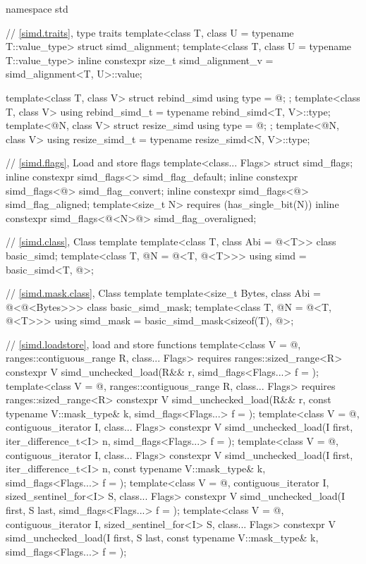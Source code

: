 \begin{codeblock}
namespace std {
  // \ref{simd.traits},  type traits
  template<class T, class U = typename T::value_type> struct simd_alignment;
  template<class T, class U = typename T::value_type>
    inline constexpr size_t simd_alignment_v = simd_alignment<T, U>::value;

  template<class T, class V> struct rebind_simd { using type = @\seebelow@; };
  template<class T, class V> using rebind_simd_t = typename rebind_simd<T, V>::type;
  template<@\simdsizetype@ N, class V> struct resize_simd { using type = @\seebelow@; };
  template<@\simdsizetype@ N, class V> using resize_simd_t = typename resize_simd<N, V>::type;

  // \ref{simd.flags}, Load and store flags
  template<class... Flags> struct simd_flags;
  inline constexpr simd_flags<> simd_flag_default{};
  inline constexpr simd_flags<@\convertflag@> simd_flag_convert{};
  inline constexpr simd_flags<@\alignedflag@> simd_flag_aligned{};
  template<size_t N> requires (has_single_bit(N))
    inline constexpr simd_flags<@\overalignedflag<N>@> simd_flag_overaligned{};

  // \ref{simd.class}, Class template 
  template<class T, class Abi = @\nativeabi@<T>> class basic_simd;
  template<class T, @\simdsizetype@ N = @\simdsizev@<T, @\nativeabi@<T>>>
    using simd = basic_simd<T, @>;

  // \ref{simd.mask.class}, Class template 
  template<size_t Bytes, class Abi = @\nativeabi@<@\integerfrom@<Bytes>>> class basic_simd_mask;
  template<class T, @\simdsizetype@ N = @\simdsizev@<T, @\nativeabi@<T>>>
    using simd_mask = basic_simd_mask<sizeof(T), @>;

  // \ref{simd.loadstore},  load and store functions
  template<class V = @\seebelow@, ranges::contiguous_range R, class... Flags>
    requires ranges::sized_range<R>
    constexpr V simd_unchecked_load(R&& r, simd_flags<Flags...> f = {});
  template<class V = @\seebelow@, ranges::contiguous_range R, class... Flags>
    requires ranges::sized_range<R>
    constexpr V simd_unchecked_load(R&& r, const typename V::mask_type& k, simd_flags<Flags...> f = {});
  template<class V = @\seebelow@, contiguous_iterator I, class... Flags>
    constexpr V simd_unchecked_load(I first, iter_difference_t<I> n, simd_flags<Flags...> f = {});
  template<class V = @\seebelow@, contiguous_iterator I, class... Flags>
    constexpr V simd_unchecked_load(I first, iter_difference_t<I> n, const typename V::mask_type& k,
                          simd_flags<Flags...> f = {});
  template<class V = @\seebelow@, contiguous_iterator I, sized_sentinel_for<I> S, class... Flags>
    constexpr V simd_unchecked_load(I first, S last, simd_flags<Flags...> f = {});
  template<class V = @\seebelow@, contiguous_iterator I, sized_sentinel_for<I> S, class... Flags>
    constexpr V simd_unchecked_load(I first, S last, const typename V::mask_type& k,
                          simd_flags<Flags...> f = {});

}
\end{codeblock}
